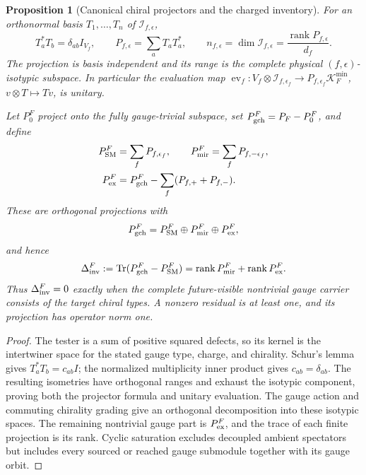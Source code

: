 \documentclass[11pt]{article}
\numberwithin{equation}{section}
\newtheorem{proposition}[theorem]{Proposition}
\theoremstyle{definition}
\theoremstyle{remark}
\newcommand{\Tr}{\operatorname{Tr}}
\newcommand{\rank}{\operatorname{rank}}
\begin{document}
\begin{proposition}[Canonical chiral projectors and the charged inventory]
\label{thm:canonical-chiral-projectors}
For an orthonormal basis $T_1,\ldots,T_n$ of $\mathcal I_{f,\epsilon}$,
\begin{equation}
 T_a^*T_b=\delta_{ab}I_{V_f},\qquad
 P_{f,\epsilon}=\sum_aT_aT_a^*,\qquad
 n_{f,\epsilon}=\dim\mathcal I_{f,\epsilon}
               =\frac{\rank P_{f,\epsilon}}{d_f}.
 \label{eq:canonical-chiral-projector}
\end{equation}
The projection is basis independent and its range is the complete physical
$(f,\epsilon)$-isotypic subspace.  In particular the evaluation map
$\operatorname{ev}_f:V_f\otimes\mathcal I_{f,\epsilon_f}
\to P_{f,\epsilon_f}\mathcal K_F^{\min}$, $v\otimes T\mapsto Tv$, is unitary.

Let $P_0^F$ project onto the fully gauge-trivial subspace, set
$P_{\rm gch}^F=P_F-P_0^F$, and define
\begin{align}
 P_{\rm SM}^F&=\sum_fP_{f,\epsilon_f},\qquad
 P_{\rm mir}^F=\sum_fP_{f,-\epsilon_f},\nonumber\\
 P_{\rm ex}^F&=P_{\rm gch}^F-\sum_f(P_{f,+}+P_{f,-}).
 \label{eq:future-visible-inventory-projectors}
\end{align}
These are orthogonal projections with
\begin{equation}
 P_{\rm gch}^F=P_{\rm SM}^F\oplus P_{\rm mir}^F\oplus P_{\rm ex}^F,
 \label{eq:future-visible-inventory-split}
\end{equation}
and hence
\begin{equation}
 \Delta_{\rm inv}^F:=\Tr(P_{\rm gch}^F-P_{\rm SM}^F)
     =\rank P_{\rm mir}^F+\rank P_{\rm ex}^F.
 \label{eq:future-visible-inventory-residual}
\end{equation}
Thus $\Delta_{\rm inv}^F=0$ exactly when the complete future-visible
nontrivial gauge carrier consists of the target chiral types.  A nonzero
residual is at least one, and its projection has operator norm one.
\end{proposition}
\begin{proof}
The tester is a sum of positive squared defects, so its kernel is the
intertwiner space for the stated gauge type, charge, and chirality.
Schur's lemma gives $T_a^*T_b=c_{ab}I$; the normalized multiplicity inner
product gives $c_{ab}=\delta_{ab}$.  The resulting isometries have orthogonal
ranges and exhaust the isotypic component, proving both the projector
formula and unitary evaluation.  The gauge action and commuting chirality
grading give an orthogonal decomposition into these isotypic spaces.  The
remaining nontrivial gauge part is $P_{\rm ex}^F$, and the trace of each
finite projection is its rank.  Cyclic saturation excludes decoupled ambient
spectators but includes every sourced or reached gauge submodule together
with its gauge orbit.
\end{proof}
\end{document}
